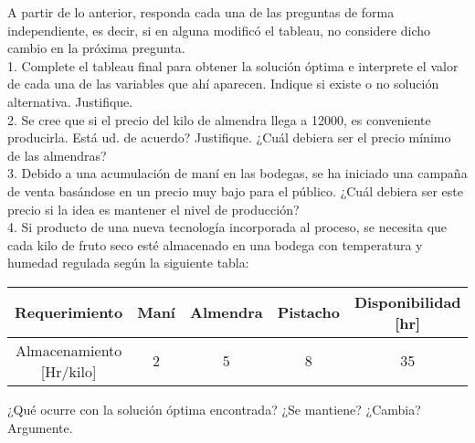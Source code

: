 A partir de lo anterior, responda cada una de las preguntas de forma independiente, es decir, si en alguna modificó el tableau, no considere dicho cambio en la próxima pregunta.\\

1. Complete el tableau final para obtener la solución óptima e interprete el valor de cada una de las variables que ahí aparecen. Indique si existe o no solución alternativa. Justifique.\\

2. Se cree que si el precio del kilo de almendra llega a 12000, es conveniente producirla. Está ud. de acuerdo? Justifique. ¿Cuál debiera ser el precio mínimo de las almendras?\\

3. Debido a una acumulación de maní en las bodegas, se ha iniciado una campaña de venta basándose en un precio muy bajo para el público. ¿Cuál debiera ser este precio si la idea es mantener el nivel de producción?\\

4. Si producto de una nueva tecnología incorporada al proceso, se necesita que cada kilo de fruto seco esté almacenado en una bodega con temperatura y humedad regulada según la siguiente tabla:

\begin{center}

\begin{tabular}{ c | c | c | c | c}
Requerimiento	& Man\'i & Almendra & Pistacho & Disponibilidad [hr]\\
\hline
Almacenamiento [Hr/kilo]	& 2	  & 5   & 8  & 35\\
\end{tabular}

\end{center}

¿Qué ocurre con la solución óptima encontrada? ¿Se mantiene? ¿Cambia? Argumente.




